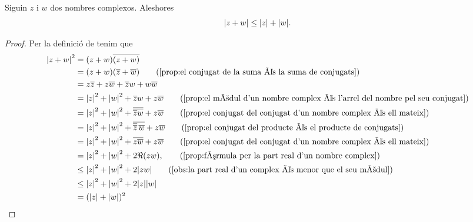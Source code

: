 \documentclass[../../Main.tex]{subfiles}
\begin{document}
	\begin{proposition}
		\label{prop:desigualta triangular nombres complexos}
		Siguin \(z\) i \(w\) dos nombres complexos.
        Aleshores
		\[
            \modul{z+w} \leq \modul{z}+\modul{w}.
        \]
		\begin{proof}
			Per la definició de  tenim que
			\begin{align*}
				\modul{z+w}^{2} &= (z+w)\conjugat{(z+w)} \\
				 &= (z+w)(\conjugat{z}+\conjugat{w}) \tag{\ref{prop:el conjugat de la suma és la suma de conjugats}} \\
				 &= z\conjugat{z}+z\conjugat{w}+\conjugat{z}w+w\conjugat{w} \\
				 &= \modul{z}^{2}+\modul{w}^{2}+\conjugat{z}w+z\conjugat{w} \tag{\ref{prop:el mòdul d'un nombre complex és l'arrel del nombre pel seu conjugat}} \\
				 &= \modul{z}^{2}+\modul{w}^{2}+\conjugat{\conjugat{\conjugat{z}w}}+z\conjugat{w} \tag{\ref{prop:el conjugat del conjugat d'un nombre complex és ell mateix}} \\
				 &= \modul{z}^{2}+\modul{w}^{2}+\conjugat{\conjugat{\conjugat{z}}\,\conjugat{w}}+z\conjugat{w} \tag{\ref{prop:el conjugat del producte és el producte de conjugats}} \\
				 &= \modul{z}^{2}+\modul{w}^{2}+\conjugat{z\conjugat{w}}+z\conjugat{w}\tag{\ref{prop:el conjugat del conjugat d'un nombre complex és ell mateix}} \\
				 &= \modul{z}^{2}+\modul{w}^{2}+2\Re(zw), \tag{\ref{prop:fórmula per la part real d'un nombre complex}} \\
				&\leq\modul{z}^{2}+\modul{w}^{2}+2\modul{zw} \tag{\ref{obs:la part real d'un complex és menor que el seu mòdul}} \\
				&\leq\modul{z}^{2}+\modul{w}^{2}+2\modul{z}\modul{w} \\
				 &= (\modul{z}+\modul{w})^{2}
			\end{align*}
		\end{proof}
	\end{proposition}
	
\end{document}

